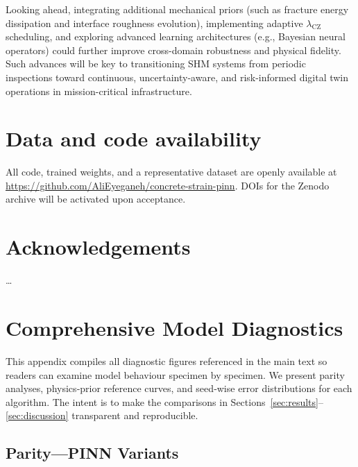 \documentclass{article}
\begin{document}
Looking ahead, integrating additional mechanical priors (such as fracture energy dissipation and interface roughness evolution), implementing adaptive $\lambda_{\mathrm{CZ}}$ scheduling, and exploring advanced learning architectures (e.g., Bayesian neural operators) could further improve cross-domain robustness and physical fidelity. Such advances will be key to transitioning SHM systems from periodic inspections toward continuous, uncertainty-aware, and risk-informed digital twin operations in mission-critical infrastructure.



\section*{Data and code availability}
All code, trained weights, and a representative dataset are openly
available at \url{https://github.com/AliEyeganeh/concrete-strain-pinn}.
DOIs for the Zenodo archive will be activated upon acceptance.

\section*{Acknowledgements}
…






\appendix 
\section{Comprehensive Model Diagnostics}
\label{app:model_diagnostics}

This appendix compiles all diagnostic figures referenced in the main text so readers can examine model behaviour specimen by specimen. We present parity analyses, physics‐prior reference curves, and seed‐wise error distributions for each algorithm. The intent is to make the comparisons in Sections~\ref{sec:results}–\ref{sec:discussion} transparent and reproducible.

\subsection{Parity—PINN Variants}
\end{document}
